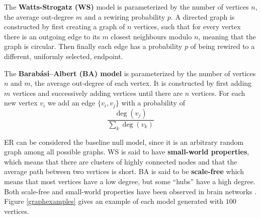 \begin{definition}
The \textbf{Watts-Strogatz (WS)} model is parameterized by the number of vertices $n$, the average out-degree $m$ and a rewiring probability $p$. A directed graph is constructed by first creating a graph of $n$ vertices, such that for every vertex there is an outgoing edge to its $m$ closest neighbours modulo $n$, meaning that the graph is circular. Then finally each edge has a probability $p$ of being rewired to a different, uniformly selected, endpoint.
\end{definition}

\begin{definition}
  The \textbf{Barabási–Albert (BA) model} is parameterized by the number of vertices $n$ and $m$, the average out-degree of each vertex. It is constructed by first adding $m$ vertices and successively adding vertices until there are $n$ vertices. For each new vertex $v_{i}$ we add an edge $\{v_{i},v_{j}\}$  with a probability of
  \[
    \frac{\deg(v_{j})}{\sum_{k} \deg(v_{k})}
  \]
\end{definition}
ER can be considered the baseline null model, since it is an arbitrary random graph among all possible graphs. WS is said to have \textbf{small-world properties}, which means that there are clusters of highly connected nodes and that the average path between two vertices is short. BA is said to be \textbf{scale-free} which means that most vertices have a low degree, but some ``hubs'' have a high degree. Both scale-free and small-world properties have been observed in brain networks \cite{SPORNS2004418}. Figure \ref{graphexamples} gives an example of each model generated with $100$ vertices.

